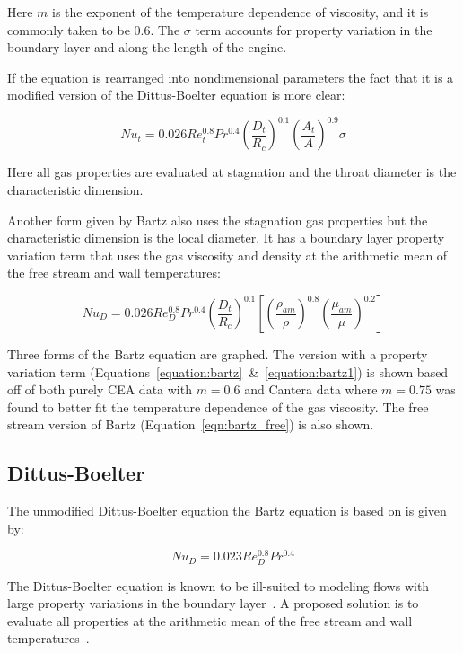 \documentclass[11pt]{article}
\begin{document}
Here $m$ is the exponent of the temperature dependence of viscosity, and it is commonly taken to be 0.6. The $\sigma$ term accounts for property variation in the boundary layer and along the length of the engine.

If the equation is rearranged into nondimensional parameters the fact that it is a modified version of the Dittus-Boelter equation is more clear:

\begin{equation}\label{equation:bartz1}
  Nu_{t} = 0.026 Re_{t}^{0.8} Pr^{0.4} \left( \frac{D_t}{R_c} \right)^{0.1} \left( \frac{A_t}{A} \right)^{0.9} \sigma
\end{equation}

Here all gas properties are evaluated at stagnation and the throat diameter is the characteristic dimension.

Another form given by Bartz also uses the stagnation gas properties but the characteristic dimension is the local diameter. It has a boundary layer property variation term that uses the gas viscosity and density at the arithmetic mean of the free stream and wall temperatures:

\begin{equation}\label{eqn:bartz_free}
  Nu_{D} = 0.026 Re_{D}^{0.8} Pr^{0.4} \left( \frac{D_t}{R_c} \right)^{0.1} \left[ \left( \frac{\rho_{am}}{\rho} \right)^{0.8} \left(\frac{\mu_{am}}{\mu} \right)^{0.2}\right]
\end{equation}

Three forms of the Bartz equation are graphed. The version with a property variation term (Equations~\ref{equation:bartz}~\&~\ref{equation:bartz1}) is shown based off of both purely CEA data with $m=0.6$ and Cantera data where $m=0.75$ was found to better fit the temperature dependence of the gas viscosity. The free stream version of Bartz (Equation~\ref{eqn:bartz_free}) is also shown.

\subsection{Dittus-Boelter}

The unmodified Dittus-Boelter equation the Bartz equation is based on is given by:

\begin{equation}
  Nu_{D} = 0.023 Re_{D}^{0.8} Pr^{0.4}
\end{equation}

The Dittus-Boelter equation is known to be ill-suited to modeling flows with large property variations in the boundary layer~\cite{bergman_fundamentals_2017}. A proposed solution is to evaluate all properties at the arithmetic mean of the free stream and wall temperatures~\cite{bartz_turbulent_1965, grisson_liquid_1991}.
\end{document}

